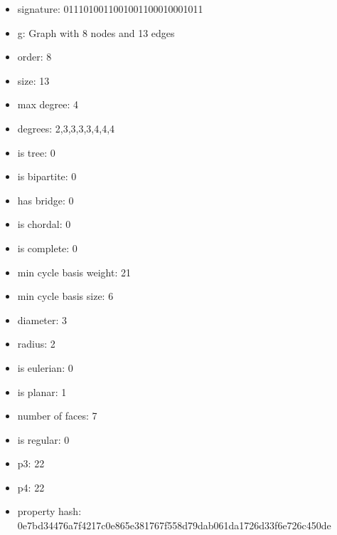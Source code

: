 \begin{itemize}
\item signature: 0111010011001001100010001011
\item g: Graph with 8 nodes and 13 edges
\item order: 8
\item size: 13
\item max degree: 4
\item degrees: 2,3,3,3,3,4,4,4
\item is tree: 0
\item is bipartite: 0
\item has bridge: 0
\item is chordal: 0
\item is complete: 0
\item min cycle basis weight: 21
\item min cycle basis size: 6
\item diameter: 3
\item radius: 2
\item is eulerian: 0
\item is planar: 1
\item number of faces: 7
\item is regular: 0
\item p3: 22
\item p4: 22
\item property hash: 0e7bd34476a7f4217c0e865e381767f558d79dab061da1726d33f6e726c450de
\end{itemize}
\newpage
\begin{figure}
\end{figure}
